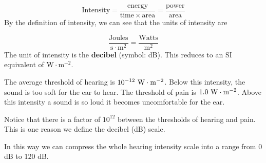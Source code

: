     \begin{equation}
    \mathrm{Intensity}=\frac{\mathrm{energy}}{\mathrm{time}\ensuremath{\times}\mathrm{area}}=\frac{\mathrm{power}}{\mathrm{area}}\tag{9.3}
      \end{equation}
        \label{m38800*id184123}By the definition of intensity, we can see that the units of intensity are\par 
        \label{m38800*id184127}\nopagebreak\noindent{}
          
    \begin{equation}
    \frac{\mathrm{Joules}}{\mathrm{s}\ensuremath{\cdot}{\mathrm{m}}^{2}}=\frac{\mathrm{Watts}}{{\mathrm{m}}^{2}}\tag{9.4}
      \end{equation}
        \label{m38800*id184185}The unit of intensity is the \textbf{decibel} (symbol: dB). This reduces to an SI equivalent of $\mathrm{W}\ensuremath{\cdot}{\mathrm{m}}^{-2}$.\par 
        \label{m38800*id184220}The average threshold of hearing is ${10}^{-12}\phantom{\rule{3.33333pt}{0ex}}\mathrm{W}\ensuremath{\cdot}{\mathrm{m}}^{-2}$. Below this intensity, the sound is too soft for the ear to hear. The threshold of pain is $1.0\phantom{\rule{3.33333pt}{0ex}}\mathrm{W}\ensuremath{\cdot}{\mathrm{m}}^{-2}$. Above this intensity a sound is so loud it becomes uncomfortable for
the ear.\par 
        \label{m38800*id184300}Notice that there is a factor of ${10}^{12}$ between the thresholds of
hearing and pain. This is one reason we define the decibel (dB) scale.\par 
        \label{m38800*id184613}In this way we can compress the whole hearing intensity scale into a
range from 0 dB to 120 dB.\par 
